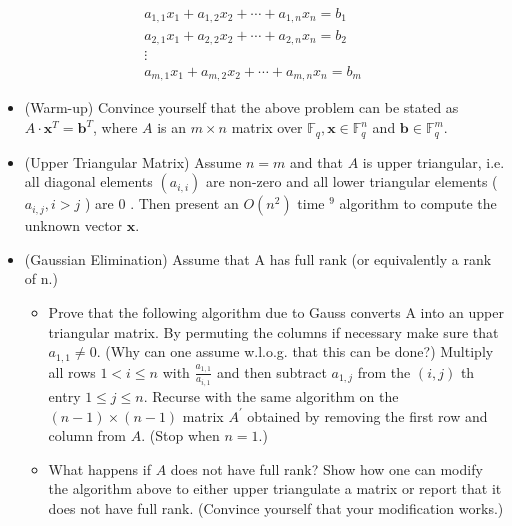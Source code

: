 \documentclass[10pt]{article}
\begin{document}
$$
\begin{gathered}
a_{1,1} x_{1}+a_{1,2} x_{2}+\cdots+a_{1, n} x_{n}=b_{1} \\
a_{2,1} x_{1}+a_{2,2} x_{2}+\cdots+a_{2, n} x_{n}=b_{2} \\
\vdots \\
a_{m, 1} x_{1}+a_{m, 2} x_{2}+\cdots+a_{m, n} x_{n}=b_{m}
\end{gathered}
$$

\begin{itemize}
  \item[1.] (Warm-up) Convince yourself that the above problem can be stated as $A \cdot \mathbf{x}^{T}=\mathbf{b}^{T}$, where $A$ is an $m \times n$ matrix over $\mathbb{F}_{q}, \mathbf{x} \in \mathbb{F}_{q}^{n}$ and $\mathbf{b} \in \mathbb{F}_{q}^{m}$.
  \item[2.] (Upper Triangular Matrix) Assume $n=m$ and that $A$ is upper triangular, i.e. all diagonal elements $\left(a_{i, i}\right)$ are non-zero and all lower triangular elements ( $a_{i, j}, i>j$ ) are 0 . Then present an $O\left(n^{2}\right)$ time ${ }^{9}$ algorithm to compute the unknown vector $\mathbf{x}$.
  \item[3.] (Gaussian Elimination) Assume that A has full rank (or equivalently a rank of n.)
  \begin{itemize}
    \item[(a)] Prove that the following algorithm due to Gauss converts A into an upper triangular matrix. By permuting the columns if necessary make sure that $a_{1,1} \neq 0$. (Why can one assume w.l.o.g. that this can be done?) Multiply all rows $1<i \leq n$ with $\frac{a_{1,1}}{a_{i, 1}}$ and then subtract $a_{1, j}$ from the $(i, j)$ th entry $1 \leq j \leq n$. Recurse with the same algorithm on the $(n-1) \times(n-1)$ matrix $A^{\prime}$ obtained by removing the first row and column from $A$. (Stop when $n=1$.)
    \item[(b)] What happens if $A$ does not have full rank? Show how one can modify the algorithm above to either upper triangulate a matrix or report that it does not have full rank. (Convince yourself that your modification works.)
  \end{itemize}
\end{itemize}
\end{document}
